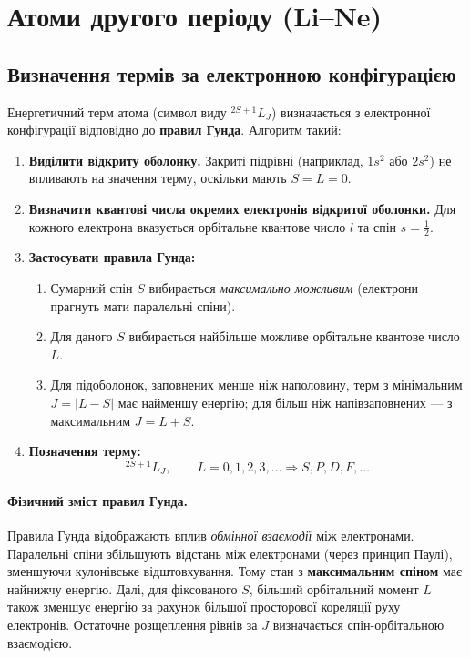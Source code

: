 
\section{Атоми другого періоду (Li--Ne)}

\subsection{Визначення термів за електронною конфігурацією}

Енергетичний терм атома (символ виду ${}^{2S+1}L_J$) визначається з електронної конфігурації відповідно до \textbf{правил Гунда}. Алгоритм такий:

\begin{enumerate}
    \item \textbf{Виділити відкриту оболонку.}
    Закриті підрівні (наприклад, $1s^2$ або $2s^2$) не впливають на значення терму, оскільки мають $S = L = 0$.

    \item \textbf{Визначити квантові числа окремих електронів відкритої оболонки.}
    Для кожного електрона вказується орбітальне квантове число $l$ та спін $s=\tfrac{1}{2}$.

    \item \textbf{Застосувати правила Гунда:}
    \begin{enumerate}[label=(\arabic*)]
        \item Сумарний спін $S$ вибирається \emph{максимально можливим} (електрони прагнуть мати паралельні спіни).
        \item Для даного $S$ вибирається найбільше можливе орбітальне квантове число $L$.
        \item Для підоболонок, заповнених менше ніж наполовину, терм з мінімальним $J = |L - S|$ має найменшу енергію;
              для більш ніж напівзаповнених — з максимальним $J = L + S$.
    \end{enumerate}

    \item \textbf{Позначення терму:}
    \[
        {}^{2S+1}L_J, \qquad L = 0,1,2,3,\ldots \Rightarrow S,P,D,F,\ldots
    \]
\end{enumerate}

\paragraph{Фізичний зміст правил Гунда.}
Правила Гунда відображають вплив \textit{обмінної взаємодії} між електронами.
Паралельні спіни збільшують відстань між електронами (через принцип Паулі), зменшуючи кулонівське відштовхування.
Тому стан з \textbf{максимальним спіном} має найнижчу енергію.
Далі, для фіксованого $S$, більший орбітальний момент $L$ також зменшує енергію за рахунок більшої просторової кореляції руху електронів.
Остаточне розщеплення рівнів за $J$ визначається спін-орбітальною взаємодією.

